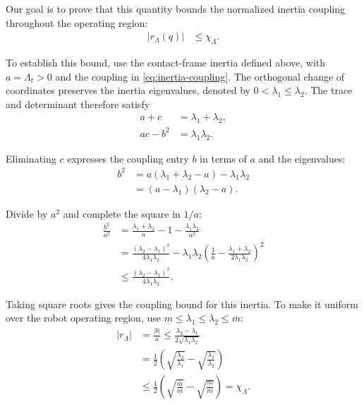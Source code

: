 \documentclass[10pt,journal,letterpaper]{IEEEtran}
\begin{document}
Our goal is to prove that this quantity bounds the normalized inertia coupling throughout the operating region:
\begin{equation}\label{eq:coupling-bound}
\begin{aligned}
|r_\Lambda(q)|&\leq\chi_\Lambda.
\end{aligned}
\end{equation}

To establish this bound, use the contact-frame inertia defined above, with $a=\Lambda_t>0$ and the coupling in \eqref{eq:inertia-coupling}. The orthogonal change of coordinates preserves the inertia eigenvalues, denoted by $0<\lambda_1\leq\lambda_2$. The trace and determinant therefore satisfy
\begin{align*}
a+c&=\lambda_1+\lambda_2,\\
ac-b^2&=\lambda_1\lambda_2.
\end{align*}

Eliminating $c$ expresses the coupling entry $b$ in terms of $a$ and the eigenvalues:
\begin{align*}
b^2
&=a(\lambda_1+\lambda_2-a)-\lambda_1\lambda_2\\
&=(a-\lambda_1)(\lambda_2-a).
\end{align*}

Divide by $a^2$ and complete the square in $1/a$:
\begin{align*}
\frac{b^2}{a^2}
&=\frac{\lambda_1+\lambda_2}{a}-1
-\frac{\lambda_1\lambda_2}{a^2}\\
&=\frac{(\lambda_2-\lambda_1)^2}{4\lambda_1\lambda_2}
-\lambda_1\lambda_2\left(
\frac{1}{a}-\frac{\lambda_1+\lambda_2}{2\lambda_1\lambda_2}
\right)^2\\
&\leq\frac{(\lambda_2-\lambda_1)^2}{4\lambda_1\lambda_2}.
\end{align*}

Taking square roots gives the coupling bound for this inertia. To make it uniform over the robot operating region, use $\underline m\leq\lambda_1\leq\lambda_2\leq\overline m$:
\begin{align*}
|r_\Lambda|
&=\frac{|b|}{a}
\leq\frac{\lambda_2-\lambda_1}{2\sqrt{\lambda_1\lambda_2}}\\
&=\frac12\left(
\sqrt{\frac{\lambda_2}{\lambda_1}}
-\sqrt{\frac{\lambda_1}{\lambda_2}}
\right)\\
&\leq\frac12\left(
\sqrt{\frac{\overline m}{\underline m}}
-\sqrt{\frac{\underline m}{\overline m}}
\right)
=\chi_\Lambda.
\end{align*}
\end{document}
